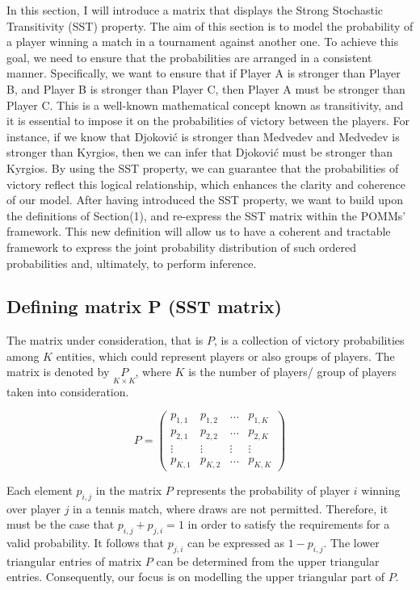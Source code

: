 \documentclass[11pt]{amsart}
\begin{document}
In this section, I will introduce a matrix that displays the Strong Stochastic Transitivity (SST) property. The aim of this section is to model the probability of a player winning a match in a tournament against another one. To achieve this goal, we need to ensure that the probabilities are arranged in a consistent manner. Specifically, we want to ensure that if Player A is stronger than Player B, and Player B is stronger than Player C, then Player A must be stronger than Player C. This is a well-known mathematical concept known as transitivity, and it is essential to impose it on the probabilities of victory between the players. For instance, if we know that Djoković is stronger than Medvedev and Medvedev is stronger than Kyrgios, then we can infer that Djoković must be stronger than Kyrgios. By using the SST property, we can guarantee that the probabilities of victory reflect this logical relationship, which enhances the clarity and coherence of our model.
After having introduced the SST property, we want to build upon the definitions of Section(1), and re-express the SST matrix within the POMMs' framework. This new definition will allow us to have a coherent and tractable framework to express the joint probability distribution of such ordered probabilities and, ultimately, to perform inference.

\subsection{Defining matrix P (SST matrix)}
The matrix under consideration, that is $P$, is a collection of victory probabilities among $K$ entities, which could represent players or also groups of players. The matrix is denoted by $\underset{K \times K}{P}$, where $K$ is the number of players/ group of players taken into consideration. 

\begin{center}
$$P = 
\left(\begin{array}{cccc}p_{1,1} & p_{1,2} &  ... & p_{1,K} \\ p_{2,1} & p_{2,2} & ... & p_{2,K} \\ \vdots & \vdots & \vdots & \vdots \\ p_{K,1}& p_{K,2 }& ... & p_{K,K}\end{array}\right)$$
\end{center}



Each element $p_{i,j}$ in the matrix $P$ represents the probability of player $i$ winning over player $j$ in a tennis match, where draws are not permitted. Therefore, it must be the case that $p_{i,j} + p_{j,i} = 1$ in order to satisfy the requirements for a valid probability. It follows that $p_{j,i}$ can be expressed as $1 - p_{i,j}$. The lower triangular entries of matrix $P$ can be determined from the upper triangular entries. Consequently, our focus is on modelling the upper triangular part of $P$.
 
\end{document}
